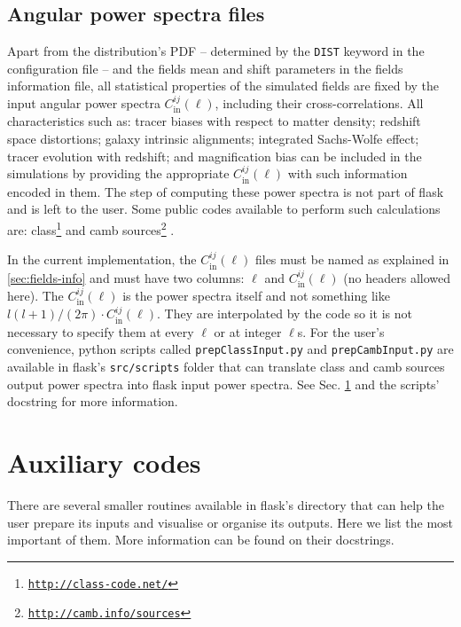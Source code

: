 \documentclass[12pt]{book} %
\newcommand{\nv}[1]{\mathrm{#1}}                 %
\begin{document}
\subsection{Angular power spectra files}
\label{sec:cls}

Apart from the distribution's PDF -- determined by the {\tt DIST} keyword in 
the configuration file -- and the fields mean and shift parameters in the fields 
information file, all statistical properties of the simulated fields are fixed 
by the input angular power spectra $C_{\nv{in}}^{ij}(\ell)$, including their 
cross-correlations. All characteristics 
such as: tracer biases with respect to matter density; redshift space distortions; 
galaxy intrinsic alignments; integrated Sachs-Wolfe effect; tracer evolution with 
redshift; and magnification bias can be included in the simulations by providing the 
appropriate $C_{\nv{in}}^{ij}(\ell)$ with such information encoded in them. The 
step of computing these power spectra is not part of {\sc flask} and is left to the user. 
Some public codes available to perform such calculations are: 
{\sc class}\footnote{\tt{\href{http://class-code.net/}{http://class-code.net/}}} 
\citep{Blas11x, Dio13x} and 
{\sc camb sources}\footnote{\tt{\href{http://camb.info/sources}{http://camb.info/sources}}}
\citep{Challinor11x}.

In the current implementation, the $C_{\nv{in}}^{ij}(\ell)$ files must be named as explained in 
\ref{sec:fields-info} and must have two columns: $\ell$ and $C_{\nv{in}}^{ij}(\ell)$ (no headers 
allowed here). The $C_{\nv{in}}^{ij}(\ell)$ is the power spectra itself and not something like 
$l(l+1)/(2\pi)\cdot C_{\nv{in}}^{ij}(\ell)$. They are interpolated by the code so it is not necessary 
to specify them at every $\ell$ or at integer $\ell$s. For the user's convenience, {\sc python} 
scripts called {\tt prepClassInput.py} and {\tt prepCambInput.py} are available in {\sc flask}'s 
{\tt src/scripts} folder that can translate {\sc class} and {\sc camb sources} output power spectra 
into {\sc flask} input power spectra. See Sec. \ref{sec:aux} and the scripts' docstring for more information. 

\section{Auxiliary codes}
\label{sec:aux} 

There are several smaller routines available in {\sc flask}'s directory that can help the user prepare 
its inputs and visualise or organise its outputs. Here we list the most important of them. More information 
can be found on their docstrings. 
\end{document}
